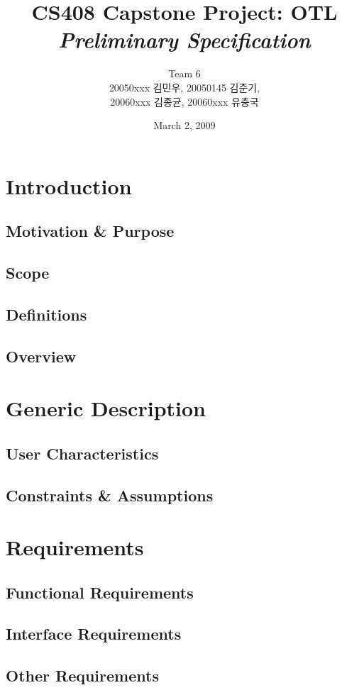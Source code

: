 \documentclass[a4paper,titlepage]{article}
\title{\textbf{CS408 Capstone Project: OTL}\\ \textit{Preliminary Specification}}
\author{Team 6\\20050xxx 김민우, 20050145 김준기,\\20060xxx 김종균, 20060xxx 유충국}
\begin{document}
\date{March 2, 2009}
\maketitle
{}
\tableofcontents
\listoffigures

\pagebreak

\section{Introduction}
\subsection{Motivation \& Purpose}
\subsection{Scope}
\subsection{Definitions}
\subsection{Overview}

\section{Generic Description}
\subsection{User Characteristics}
\subsection{Constraints \& Assumptions}

\section{Requirements}
\subsection{Functional Requirements}
\subsection{Interface Requirements}
\subsection{Other Requirements}
\end{document}
